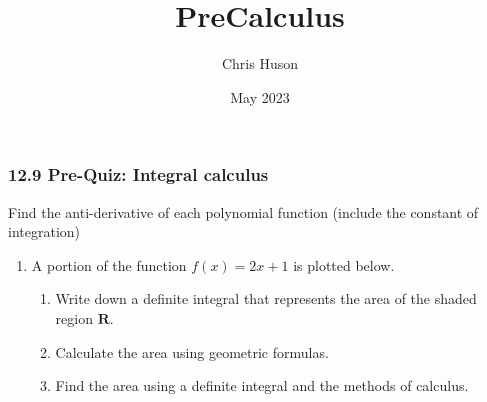 \documentclass[12pt, twoside]{article}
\title{PreCalculus}
\author{Chris Huson}
\date{May 2023}
\begin{document}
\subsubsection*{12.9 Pre-Quiz: Integral calculus}

Find the anti-derivative of each polynomial function (include the constant of integration)

\begin{enumerate}
 \vspace{1cm}


\item A portion of the function $f(x)=2x+1$ is plotted below.
    \begin{enumerate}
      \item Write down a definite integral that represents the area of the shaded region $\mathbf{R}$. \vspace{1cm}
      \item Calculate the area using geometric formulas.
        \begin{flushright}
        \end{flushright}
      \item Find the area using a definite integral and the methods of calculus. \vspace{2cm}
    \end{enumerate}


\end{enumerate}
\end{document}
